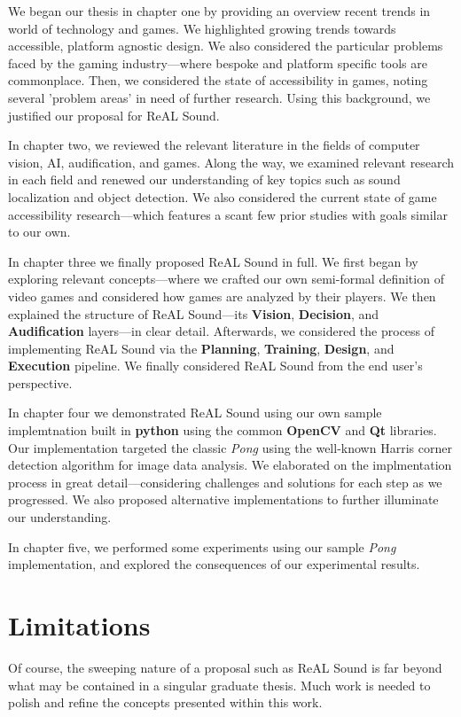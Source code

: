\documentclass{report}
\newcommand{\rs}{ReAL Sound\xspace}
\newcommand{\plan}{\textbf{Planning}\xspace}
\newcommand{\train}{\textbf{Training}\xspace}
\newcommand{\design}{\textbf{Design}\xspace}
\newcommand{\exec}{\textbf{Execution}\xspace}
\newcommand{\vision}{\textbf{Vision}\xspace}
\newcommand{\decision}{\textbf{Decision}\xspace}
\newcommand{\audio}{\textbf{Audification}\xspace}
\newcommand{\tech}[1]{\textbf{#1}}
\begin{document}
We began our thesis in chapter one by providing an overview recent trends in world of technology and games. We highlighted growing trends towards accessible, platform agnostic design. We also considered the particular problems faced by the gaming industry---where bespoke and platform specific tools are commonplace. Then, we considered the state of accessibility in games, noting several 'problem areas' in need of further research. Using this background, we justified our proposal for \rs. 

In chapter two, we reviewed the relevant literature in the fields of computer vision, AI, audification, and games. Along the way, we examined relevant research in each field and renewed our understanding of key topics such as sound localization and object detection. We also considered the current state of game accessibility research---which features a scant few prior studies with goals similar to our own.

In chapter three we finally proposed \rs in full. We first began by exploring relevant concepts---where we crafted our own semi-formal definition of video games and considered how games are analyzed by their players. We then explained the structure of \rs---its \vision, \decision, and \audio layers---in clear detail. Afterwards, we considered the process of implementing \rs via the \plan, \train, \design, and \exec pipeline. We finally considered \rs from the end user's perspective.

In chapter four we demonstrated \rs using our own sample implemtnation built in \tech{python} using the common \tech{OpenCV} and \tech{Qt} libraries. Our implementation targeted the classic \emph{Pong} using the well-known Harris corner detection algorithm for image data analysis. We elaborated on the implmentation process in great detail---considering challenges and solutions for each step as we progressed. We also proposed alternative implementations to further illuminate our understanding.

In chapter five, we performed some experiments using our sample \emph{Pong} implementation, and explored the consequences of our experimental results.

\section{Limitations}
Of course, the sweeping nature of a proposal such as \rs is far beyond what may be contained in a singular graduate thesis. Much work is needed to polish and refine the concepts presented within this work.
\end{document}

